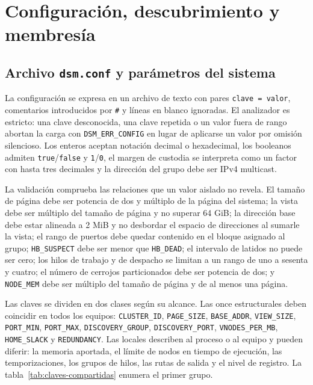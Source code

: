 \section{Configuración, descubrimiento y membresía}\label{sec:configuracion}

\subsection{Archivo \texttt{dsm.conf} y parámetros del sistema}

La configuración se expresa en un archivo de texto con pares \texttt{clave = valor}, comentarios introducidos por \texttt{\#} y líneas en blanco ignoradas. El analizador es estricto: una clave desconocida, una clave repetida o un valor fuera de rango abortan la carga con \texttt{DSM\_ERR\_CONFIG} en lugar de aplicarse un valor por omisión silencioso. Los enteros aceptan notación decimal o hexadecimal, los booleanos admiten \texttt{true}/\texttt{false} y \texttt{1}/\texttt{0}, el margen de custodia se interpreta como un factor con hasta tres decimales y la dirección del grupo debe ser IPv4 multicast.

La validación comprueba las relaciones que un valor aislado no revela. El tamaño de página debe ser potencia de dos y múltiplo de la página del sistema; la vista debe ser múltiplo del tamaño de página y no superar 64 GiB; la dirección base debe estar alineada a 2 MiB y no desbordar el espacio de direcciones al sumarle la vista; el rango de puertos debe quedar contenido en el bloque asignado al grupo; \texttt{HB\_SUSPECT} debe ser menor que \texttt{HB\_DEAD}; el intervalo de latidos no puede ser cero; los hilos de trabajo y de despacho se limitan a un rango de uno a sesenta y cuatro; el número de cerrojos particionados debe ser potencia de dos; y \texttt{NODE\_MEM} debe ser múltiplo del tamaño de página y de al menos una página.

Las claves se dividen en dos clases según su alcance. Las once estructurales deben coincidir en todos los equipos: \texttt{CLUSTER\_ID}, \texttt{PAGE\_SIZE}, \texttt{BASE\_ADDR}, \texttt{VIEW\_SIZE}, \texttt{PORT\_MIN}, \texttt{PORT\_MAX}, \texttt{DISCOVERY\_GROUP}, \texttt{DISCOVERY\_PORT}, \texttt{VNODES\_PER\_MB}, \texttt{HOME\_SLACK} y \texttt{REDUNDANCY}. Las locales describen al proceso o al equipo y pueden diferir: la memoria aportada, el límite de nodos en tiempo de ejecución, las temporizaciones, los grupos de hilos, las rutas de salida y el nivel de registro. La tabla~\ref{tab:claves-compartidas} enumera el primer grupo.

